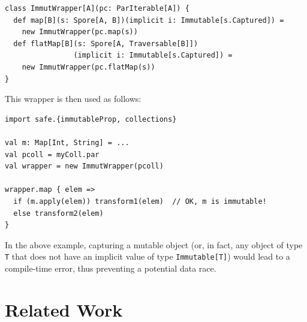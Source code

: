 \documentclass{llncs}
\begin{document}
\begin{verbatim}
class ImmutWrapper[A](pc: ParIterable[A]) {
  def map[B](s: Spore[A, B])(implicit i: Immutable[s.Captured]) =
    new ImmutWrapper(pc.map(s))
  def flatMap[B](s: Spore[A, Traversable[B]])
                (implicit i: Immutable[s.Captured]) =
    new ImmutWrapper(pc.flatMap(s))
}
\end{verbatim}
\noindent
This wrapper is then used as follows:

\begin{verbatim}
import safe.{immutableProp, collections}

val m: Map[Int, String] = ...
val pcoll = myColl.par
val wrapper = new ImmutWrapper(pcoll)

wrapper.map { elem =>
  if (m.apply(elem)) transform1(elem)  // OK, m is immutable!
  else transform2(elem)
}
\end{verbatim}
\noindent
In the above example, capturing a mutable object (or, in fact, any object of type \verb|T| that does not have an implicit value of type \verb|Immutable[T]|) would lead to a compile-time error, thus preventing a potential data race.





\section{Related Work}
\label{sec:related-work}
\end{document}

